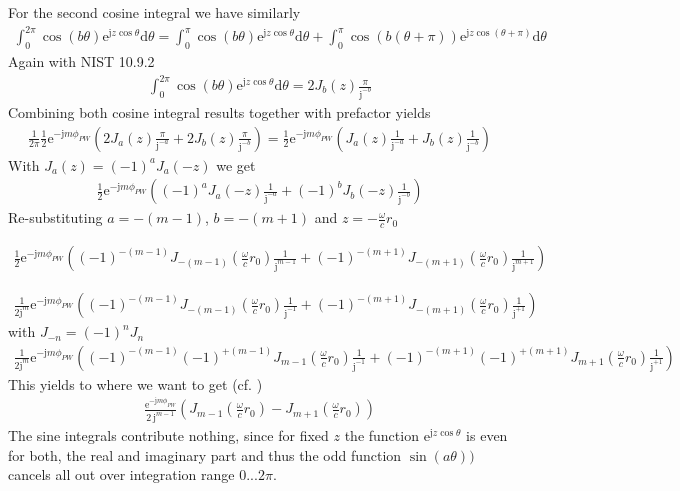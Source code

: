 \documentclass[a4paper,BCOR=15mm,10pt,twoside]{scrartcl}
\newcommand\e{\mathrm{e}}  %
\newcommand\im{\mathrm{j}}  %
\newcommand\fsd{\mathrm{d}}  %
\newcommand{\ExCalcCol}[2][CalcColor]{\textcolor{#1}{#2}} %
\begin{document}
For the second cosine integral we have similarly
\begin{align}
\int_0^{2\pi} \cos(b\theta) \mathrm{e}^{\mathrm{j} z \cos\theta} \fsd \theta = 
\int_0^{\pi} \cos(b\theta) \mathrm{e}^{\mathrm{j} z \cos\theta} \fsd \theta +
\int_0^{\pi} \cos(b(\theta+\pi)) \mathrm{e}^{\mathrm{j} z \cos(\theta+\pi)} \fsd \theta
\end{align}
Again with NIST 10.9.2
\begin{align}
\int_0^{2\pi} \cos(b\theta) \mathrm{e}^{\mathrm{j} z \cos\theta} \fsd \theta = 
2 J_{b}(z) \frac{\pi}{\im^{-b}}
\end{align}
Combining both cosine integral results together with prefactor yields
\begin{align}
\frac{1}{2\pi}
\frac{1}{2}
\e^{- \im m \phi_{PW}}
(2 J_{a}(z) \frac{\pi}{\im^{-a}} + 2 J_{b}(z) \frac{\pi}{\im^{-b}})
=
\frac{1}{2}
\e^{- \im m \phi_{PW}}
(J_{a}(z) \frac{1}{\im^{-a}} + J_{b}(z) \frac{1}{\im^{-b}})
\end{align}
With $J_a(z) = (-1)^a J_a(-z)$ we get
\begin{align}
\frac{1}{2}
\e^{- \im m \phi_{PW}}
((-1)^a J_{a}(-z) \frac{1}{\im^{-a}} + (-1)^b J_{b}(-z) \frac{1}{\im^{-b}})
\end{align}
Re-substituting $a=-(m-1)$, $b=-(m+1)$ and $z=-\frac{\omega}{c} r_0 $
\begin{calc}
\ExCalcCol{
\begin{align}
\frac{1}{2}
\e^{- \im m \phi_{PW}}
((-1)^{-(m-1)} J_{-(m-1)}(\frac{\omega}{c} r_0) \frac{1}{\im^{m-1}} + (-1)^{-(m+1)} J_{-(m+1)}(\frac{\omega}{c} r_0) \frac{1}{\im^{m+1}})
\end{align}
}
\end{calc}
\begin{align}
\frac{1}{2 \im^m}
\e^{- \im m \phi_{PW}}
((-1)^{-(m-1)} J_{-(m-1)}(\frac{\omega}{c} r_0) \frac{1}{\im^{-1}} + (-1)^{-(m+1)} J_{-(m+1)}(\frac{\omega}{c} r_0) \frac{1}{\im^{+1}})
\end{align}
with $J_{-n} = (-1)^n J_n$
\begin{align}
\frac{1}{2 \im^m}
\e^{- \im m \phi_{PW}}
((-1)^{-(m-1)} (-1)^{+(m-1)} J_{m-1}(\frac{\omega}{c} r_0) \frac{1}{\im^{-1}} + (-1)^{-(m+1)} (-1)^{+(m+1)} J_{m+1}(\frac{\omega}{c} r_0) \frac{1}{\im^{+1}})
\end{align}
This yields to where we want to get (cf.  \cite[Table 1]{Hahn2016AES})
\begin{align}
\frac{\e^{- \im m \phi_{PW}}}{2\,\im^{m-1}}
(J_{m-1}(\frac{\omega}{c} r_0) - J_{m+1}(\frac{\omega}{c} r_0))
\end{align}
The sine integrals contribute nothing, since for fixed $z$ the function 
$\mathrm{e}^{\mathrm{j} z \cos\theta}$ is even for both, the real and imaginary 
part and thus the odd function $\sin(a\theta))$ cancels all out over integration 
range $0...2\pi$.
\end{document}
